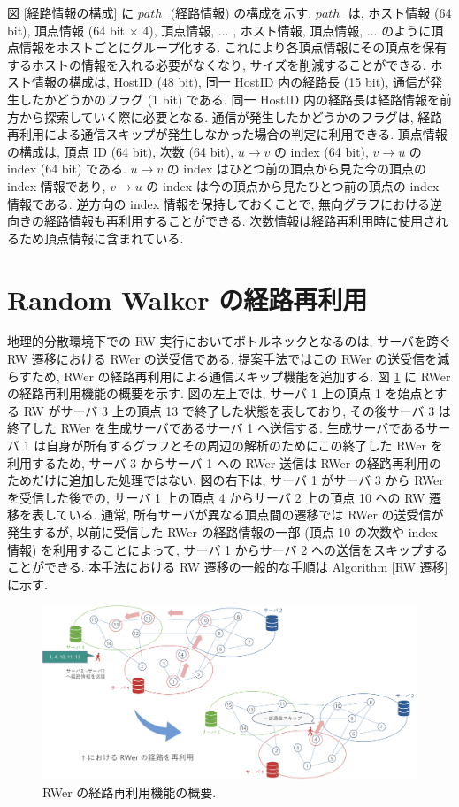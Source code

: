 図 \ref{経路情報の構成} に $path\_$ (経路情報) の構成を示す. $path\_$ は, ホスト情報 (64 bit), 頂点情報 (64 bit $\times$ 4), 頂点情報, ... , ホスト情報, 頂点情報, ... のように頂点情報をホストごとにグループ化する. これにより各頂点情報にその頂点を保有するホストの情報を入れる必要がなくなり, サイズを削減することができる. ホスト情報の構成は, HostID (48 bit), 同一 HostID 内の経路長 (15 bit), 通信が発生したかどうかのフラグ (1 bit) である. 同一 HostID 内の経路長は経路情報を前方から探索していく際に必要となる. 通信が発生したかどうかのフラグは, 経路再利用による通信スキップが発生しなかった場合の判定に利用できる. 頂点情報の構成は, 頂点 ID (64 bit), 次数 (64 bit), $u \rightarrow v$ の index (64 bit), $v \rightarrow u$ の index (64 bit) である. $u \rightarrow v$ の index はひとつ前の頂点から見た今の頂点の index 情報であり, $v \rightarrow u$ の index は今の頂点から見たひとつ前の頂点の index 情報である. 逆方向の index 情報を保持しておくことで, 無向グラフにおける逆向きの経路情報も再利用することができる. 次数情報は経路再利用時に使用されるため頂点情報に含まれている.

\section{Random Walker の経路再利用}\label{Random Walker の経路再利用}

地理的分散環境下での RW 実行においてボトルネックとなるのは, サーバを跨ぐ RW 遷移における RWer の送受信である. 提案手法ではこの RWer の送受信を減らすため, RWer の経路再利用による通信スキップ機能を追加する. 図 \ref{RWer の経路再利用機能の概要} に RWer の経路再利用機能の概要を示す. 図の左上では, サーバ 1 上の頂点 1 を始点とする RW がサーバ 3 上の頂点 13 で終了した状態を表しており, その後サーバ 3 は終了した RWer を生成サーバであるサーバ 1 へ送信する. 生成サーバであるサーバ 1 は自身が所有するグラフとその周辺の解析のためにこの終了した RWer を利用するため, サーバ 3 からサーバ 1 への RWer 送信は RWer の経路再利用のためだけに追加した処理ではない. 図の右下は, サーバ 1 がサーバ 3 から RWer を受信した後での, サーバ 1 上の頂点 4 からサーバ 2 上の頂点 10 への RW 遷移を表している. 通常, 所有サーバが異なる頂点間の遷移では RWer の送受信が発生するが, 以前に受信した RWer の経路情報の一部 (頂点 10 の次数や index 情報) を利用することによって, サーバ 1 からサーバ 2 への送信をスキップすることができる. 本手法における RW 遷移の一般的な手順は Algorithm \ref{RW 遷移} に示す.

\begin{figure}[t]
    \centering
    \includegraphics[scale=0.5]{figure/cache_gai.pdf}
    \caption{RWer の経路再利用機能の概要.}
    \label{RWer の経路再利用機能の概要}
\end{figure}

